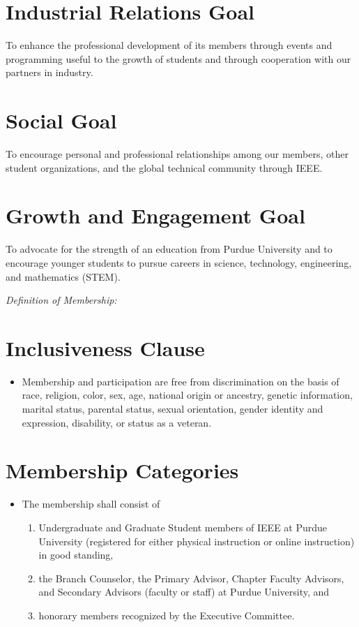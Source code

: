 \documentclass[12pt]{constitution}
\begin{document}
\section{Industrial Relations Goal}
\label{sec:purp_prof}
To enhance the professional development of its members through events and programming useful to the growth of students and through cooperation with our partners in industry.

\section{Social Goal}
\label{sec:purp_soc}
To encourage personal and professional relationships among our members, other student organizations, and the global technical community through IEEE.

\section{Growth and Engagement Goal}
\label{sec:purp_out}
To advocate for the strength of an education from Purdue University and to encourage younger students to pursue careers in science, technology, engineering, and mathematics (STEM).


\label{art:members}

\textit{Definition of Membership:}

\section{Inclusiveness Clause}
\label{sec:mem_inclusive}
\begin{itemize}
    \item Membership and participation are free from discrimination on the basis of race, religion, color, sex, age, national origin or ancestry, genetic information, marital status, parental status, sexual orientation, gender identity and expression, disability, or status as a veteran.
\end{itemize}

\section{Membership Categories}
\label{sec:mem_categ}
\begin{itemize}
    \item The membership shall consist of
    \begin{enumerate}
        \item Undergraduate and Graduate Student members of IEEE at Purdue University (registered for either physical instruction or online instruction) in good standing,
        \item the Branch Counselor, the Primary Advisor, Chapter Faculty Advisors, and Secondary Advisors (faculty or staff) at Purdue University, and
        \item honorary members recognized by the Executive Committee.
    \end{enumerate}
\end{itemize}
\end{document}
